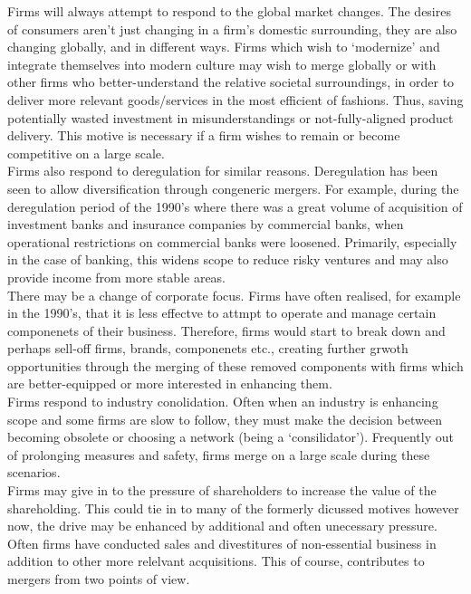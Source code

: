 \documentclass[11pt, english]{article}
\begin{document}
	Firms will always attempt to respond to the global market changes. The desires of consumers aren't just changing in a firm's domestic surrounding, they are also changing globally, and in different ways. Firms which wish to `modernize' and integrate themselves into modern culture may wish to merge globally or with other firms who better-understand the relative societal surroundings, in order to deliver more relevant goods/services in the most efficient of fashions. Thus, saving potentially wasted investment in misunderstandings or not-fully-aligned product delivery. This motive is necessary if a firm wishes to remain or become competitive on a large scale.\\

        Firms also respond to deregulation for similar reasons. Deregulation has been seen to allow diversification through congeneric mergers. For example, during the deregulation period of the 1990's where there was a great volume of acquisition of investment banks and insurance companies by commercial banks, when operational restrictions on commercial banks were loosened. Primarily, especially in the case of banking, this widens scope to reduce risky ventures and may also provide income from more stable areas.\\

        There may be a change of corporate focus. Firms have often realised, for example in the 1990's, that it is less effectve to attmpt to operate and manage certain componenets of their business. Therefore, firms would start to break down and perhaps sell-off firms, brands, componenets etc., creating further grwoth opportunities through the merging of these removed components with firms which are better-equipped or more interested in enhancing them.\\

        Firms respond to industry conolidation. Often when an industry is enhancing scope and some firms are slow to follow, they must make the decision between becoming obsolete or choosing a network (being a `consilidator'). Frequently out of prolonging measures and safety, firms merge on a large scale during these scenarios.\\

        Firms may give in to the pressure of shareholders to increase the value of the shareholding. This could tie in to many of the formerly dicussed motives however now, the drive may be enhanced by additional and often unecessary pressure. Often firms have conducted sales and divestitures of non-essential business in addition to other more relelvant acquisitions. This of course, contributes to mergers from two points of view.
	
\end{document}
